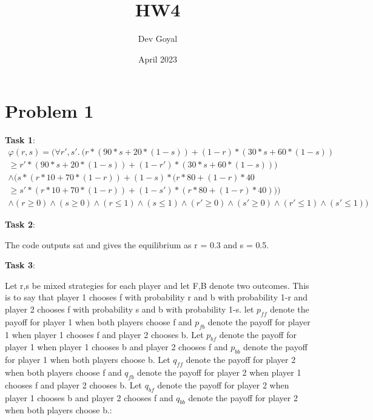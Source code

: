 \documentclass[12pt]{article}
\title{HW4}
\author{Dev Goyal}
\date{April 2023}
\begin{document}
\maketitle

\section*{Problem 1}

\noindent \textbf{Task 1}: \newline
\begin {equation}
\begin{split}
    \varphi (r,s) = (\forall r',s'. \ (r*(90*s + 20*(1-s)) + (1-r)*(30*s + 60*(1-s)) \\ \geq r'*(90*s + 20*(1-s)) + (1-r')*(30*s + 60*(1-s))) \\ 
    \land (s*(r*10 + 70 * (1-r)) + (1-s)*(r*80 + (1-r)*40 \\ \geq s'*(r*10 + 70 * (1-r)) + (1-s')*(r*80 + (1-r)*40)))\\ \land (r \geq 0) \land (s \geq 0) \land (r \leq 1) \land (s \leq 1) \land (r' \geq 0) \land (s' \geq 0) \land (r' \leq 1) \land (s' \leq 1))
\end{split}
\end {equation}

\noindent \textbf{Task 2}: \newline

The code outputs sat and gives the equilibrium as r = 0.3 and s = 0.5.

\noindent \textbf{Task 3}: \newline

Let r,s be mixed strategies for each player and let F,B denote two outcomes. This is to say that player 1 chooses f with probability r and b with probability 1-r and player 2 chooses f with probability s and b with probability 1-s. let $p_{ff}$ denote the payoff for player 1 when both players choose f and $p_{fb}$ denote the payoff for player 1 when player 1 chooses f and player 2 chooses b. Let $p_{bf}$ denote the payoff for player 1 when player 1 chooses b and player 2 chooses f and $p_{bb}$ denote the payoff for player 1 when both players choose b. Let $q_{ff}$ denote the payoff for player 2 when both players choose f and $q_{fb}$ denote the payoff for player 2 when player 1 chooses f and player 2 chooses b. Let $q_{bf}$ denote the payoff for player 2 when player 1 chooses b and player 2 chooses f and $q_{bb}$ denote the payoff for player 2 when both players choose b.:
\end{document}
